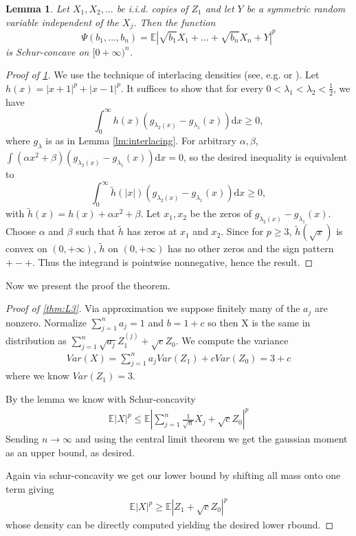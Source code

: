 \documentclass[10pt]{article}
\newcommand{\dd}{\mathrm{d}}
\newcommand{\E}{\mathbb{E}}
\newcommand{\1}{\textbf{1}}
\newtheorem{lemma}{Lemma}[subsection]
\theoremstyle{remark}
\theoremstyle{definition}
\begin{document}
\begin{lemma}\label{lm:schur}
Let $X_1, X_2, \dots$ be i.i.d. copies of $Z_1$ and let $Y$ be a symmetric random variable independent of the $X_j$. Then the function
\[
\Psi(b_1,\dots,b_n) = \E|\sqrt{b_1}X_1+\dots+\sqrt{b_n}X_n + Y|^p
\]
is Schur-concave on $[0+\infty)^n$.
\end{lemma}
\begin{proof}[Proof of \ref{lm:schur}]
We use the technique of interlacing densities (see, e.g. \cite{ENT2} or \cite{NZ}). Let $h(x) = |x+1|^p+|x-1|^p$. It suffices to show that for every $0 < \lambda_1 < \lambda_2 < \frac{1}{2}$, we have
\[
\int_0^\infty h(x)(g_{\lambda_2(x)} - g_{\lambda_1}(x)) \dd x \geq 0,
\]
where $g_\lambda$ is as in Lemma \ref{lm:interlacing}. For arbitrary $\alpha, \beta$, $\int (\alpha x^2+\beta)(g_{\lambda_2(x)} - g_{\lambda_1}(x)) \dd x = 0$, so the desired inequality is equivalent to 
\[
\int_0^\infty \tilde h(|x|)(g_{\lambda_2(x)} - g_{\lambda_1}(x)) \dd x \geq 0,
\]
with $\tilde h(x) = h(x) + \alpha x^2 + \beta$. Let $x_1, x_2$ be the zeros of $g_{\lambda_2(x)} - g_{\lambda_1}(x)$. Choose $\alpha$ and $\beta$ such that $\tilde h$ has zeros at $x_1$ and $x_2$. Since for $p \geq 3$, $\tilde h(\sqrt{x})$ is convex on $(0,+\infty)$, $\tilde h$ on $(0,+\infty)$ has no other zeros and the sign pattern $+-+$. Thus the integrand is pointwise nonnegative, hence the result.
\end{proof}

Now we present the proof the theorem.

\begin{proof}[Proof of \ref{thm:L3}]


	Via approximation we suppose finitely many of the $a_j$ are nonzero. Normalize $\sum_{j=1}^n a_j = 1$ and $b = 1+c$ so then X is the same in distribution as $\sum_{j=1}^n \sqrt{a_j}Z_1^{(j)} + \sqrt{c}Z_0$. We compute the variance
	\begin{align*}
		Var(X) = \sum_{j=1}^na_jVar(Z_1) + cVar(Z_0) = 3+c
	\end{align*}
	where we know $Var(Z_1) = 3$. 

	By the lemma we know with Schur-concavity
	\begin{align*}
		\E |X|^p \leq \E|\sum_{j=1}^n \frac{1}{\sqrt{n}} X_j + \sqrt{c}Z_0|^p
	\end{align*}
	Sending $n \to \infty$ and using the central limit theorem we get the gaussian moment as an upper bound, as desired. 

	Again via schur-concavity we get our lower bound by shifting all mass onto one term giving
	\begin{align*}
		\E |X|^p \geq \E |Z_1 + \sqrt{c}Z_0|^p
	\end{align*}
	whose density can be directly computed yielding the desired lower rbound.
\end{proof}
\end{document}
